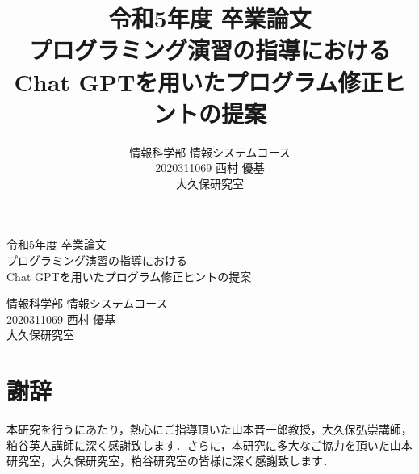 \documentclass[a4j, 12pt]{jsbook}
\title{令和5年度 卒業論文\\プログラミング演習の指導におけるChat GPTを用いたプログラム修正ヒントの提案}
\author{情報科学部 情報システムコース\\ 2020311069 西村 優基\\ 大久保研究室}
\date{}
\begin{document}

\begin{titlepage}
\begin{centering}

\vspace*{3cm}
{\LARGE 令和5年度 卒業論文}\\
\vspace*{1cm}
{\LARGE プログラミング演習の指導における\\Chat GPTを用いたプログラム修正ヒントの提案}\\
\vspace*{6cm}

{\large 情報科学部 情報システムコース\\
2020311069 西村 優基\\
大久保研究室}

\end{centering}
\end{titlepage}

\tableofcontents







% 





\chapter*{謝辞}
本研究を行うにあたり，熱心にご指導頂いた山本晋一郎教授，大久保弘崇講師，粕谷英人講師に深く感謝致します．さらに，本研究に多大なご協力を頂いた山本研究室，大久保研究室，粕谷研究室の皆様に深く感謝致します．
\end{document}

